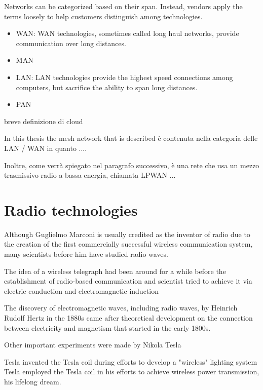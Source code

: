 	Networks can be categorized based on their span.
	Instead, vendors apply the terms loosely to help customers distinguish among technologies.
	\begin{itemize}
		\item WAN: WAN technologies, sometimes called long haul networks, provide communication
		over long distances.
		\item MAN
		\item LAN: 	LAN technologies provide the highest speed connections among computers, but
		sacrifice the ability to span long distances.
		\item PAN
	\end{itemize}
	
	breve definizione di cloud
	
	In this thesis the mesh network that is described è contenuta nella categoria delle LAN / WAN in quanto .... 
	
	Inoltre, come verrà spiegato nel paragrafo successivo, è una rete che usa un mezzo trasmissivo radio a bassa energia, chiamata LPWAN ... 
	
	\newpage	

\section{Radio technologies}\label{sec:section_two}
	
	Although Guglielmo Marconi is usually credited as the inventor of radio due to the creation of the first commercially successful wireless communication system, many scientists before him have studied radio waves.
	
	The idea of a wireless telegraph had been around for a while before the establishment of radio-based communication and scientist tried to achieve it via electric conduction and electromagnetic induction
	
	The discovery of electromagnetic waves, including radio waves, by Heinrich Rudolf Hertz in the 1880s came after theoretical development on the connection between electricity and magnetism that started in the early 1800s.
		
	
	
	Other important experiments were made by Nikola Tesla
	
	Tesla invented the Tesla coil during efforts to develop a "wireless" lighting system	
	Tesla employed the Tesla coil in his efforts to achieve wireless power transmission, his lifelong dream. 
	
